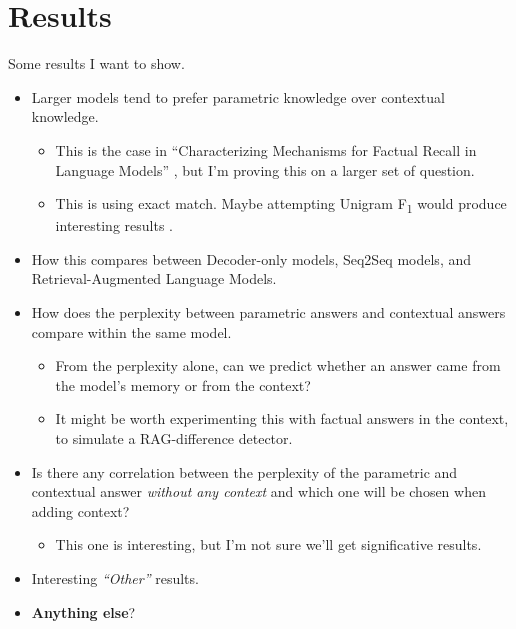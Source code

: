 \section{Results}

Some results I want to show.
\begin{itemize}
	\item Larger models tend to prefer parametric knowledge over contextual knowledge.
		\begin{itemize}
			\item This is the case in ``Characterizing Mechanisms for Factual Recall in Language Models'' \citep{factual_recall}, but I'm proving this on a larger set of question.
			\item This is using exact match. Maybe attempting Unigram F\textsubscript{1} would produce interesting results \citep{kilt}.
		\end{itemize}
	\item How this compares between Decoder-only models, Seq2Seq models, and Retrieval-Augmented Language Models.
	\item How does the perplexity between parametric answers and contextual answers compare within the same model.
		\begin{itemize}
			\item From the perplexity alone, can we predict whether an answer came from the model's memory or from the context?
			\item It might be worth experimenting this with factual answers in the context, to simulate a RAG-difference detector.
		\end{itemize}
	\item Is there any correlation between the perplexity of the parametric and contextual answer \textit{without any context} and which one will be chosen when adding context?
		\begin{itemize}
			\item This one is interesting, but I'm not sure we'll get significative results.
		\end{itemize}
	\item Interesting \textsl{``Other''} results.
	\item \textbf{Anything else}?
\end{itemize}
